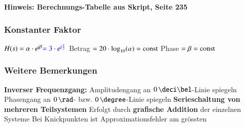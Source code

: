 \begin{minipage}[t]{0.48\columnwidth}
    
\end{minipage}
\hfill
\begin{minipage}[t]{0.48\columnwidth}
    
\end{minipage}

\textbf{Hinweis: Berechnungs-Tabelle aus Skript, Seite 235} 

\begingroup
\renewcommand{\arraystretch}{2}
\setlength{\tabcolsep}{0mm}
\endgroup
\renewcommand{\arraystretch}{1}

\vspace{0.2cm}

\begin{minipage}[t]{0.48\columnwidth}
    \raggedright
    \subsubsection{Konstanter Faktor}

    \begin{outline}
        \1 $H(s) = \alpha \cdot e^{\mathrm{j} \beta} {\color{blue}= 3 \cdot e^{\mathrm{j} \frac{\pi}{2}}}$
            \2 Betrag $= 20 \cdot \log_{10}(\alpha) = \mathrm{const}$
            \2 Phase $= \beta = \mathrm{const}$
    \end{outline}
    
    
\end{minipage}
\hfill
\begin{minipage}[t]{0.48\columnwidth}
    \raggedright
    \subsubsection{Weitere Bemerkungen}

    \begin{outline}
        \1 \textbf{Inverser Frequenzgang:}
            \2 Amplitudengang an $0 \, \deci \bel$-Linie spiegeln
            \2 Phasengang an $0 \, \rad$- bzw. $0 \, \degree$-Linie spiegeln
        \1 \textbf{Serieschaltung von mehreren Teilsystemen}
            \2 Erfolgt durch \textbf{grafische Addition} der einzelnen Systeme
        \1 Bei Knickpunkten ist Approximationsfehler am grössten
    \end{outline}

\end{minipage}


